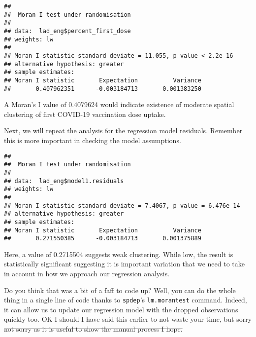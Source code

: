\documentclass[
]{book}
\newenvironment{Shaded}{\begin{snugshade}}{\end{snugshade}}
\newcommand{\CommentTok}[1]{\textcolor[rgb]{0.56,0.35,0.01}{\textit{#1}}}
\newcommand{\FunctionTok}[1]{\textcolor[rgb]{0.00,0.00,0.00}{#1}}
\newcommand{\NormalTok}[1]{#1}
\newcommand{\OtherTok}[1]{\textcolor[rgb]{0.56,0.35,0.01}{#1}}
\newcommand{\SpecialCharTok}[1]{\textcolor[rgb]{0.00,0.00,0.00}{#1}}
\begin{document}
\begin{verbatim}
## 
##  Moran I test under randomisation
## 
## data:  lad_eng$percent_first_dose  
## weights: lw    
## 
## Moran I statistic standard deviate = 11.055, p-value < 2.2e-16
## alternative hypothesis: greater
## sample estimates:
## Moran I statistic       Expectation          Variance 
##       0.407962351      -0.003184713       0.001383250
\end{verbatim}

A Moran's I value of 0.4079624 would indicate existence of moderate spatial clustering of first COVID-19 vaccination dose uptake.

Next, we will repeat the analysis for the regression model residuals. Remember this is more important in checking the model assumptions.

\begin{Shaded}
\end{Shaded}

\begin{verbatim}
## 
##  Moran I test under randomisation
## 
## data:  lad_eng$model1.residuals  
## weights: lw    
## 
## Moran I statistic standard deviate = 7.4067, p-value = 6.476e-14
## alternative hypothesis: greater
## sample estimates:
## Moran I statistic       Expectation          Variance 
##       0.271550385      -0.003184713       0.001375889
\end{verbatim}

Here, a value of 0.2715504 suggests weak clustering. While low, the result is statistically significant suggesting it is important variation that we need to take in account in how we approach our regression analysis.

Do you think that was a bit of a faff to code up? Well, you can do the whole thing in a single line of code thanks to \texttt{spdep}'s \texttt{lm.morantest} command. Indeed, it can allow us to update our regression model with the dropped observations quickly too. \sout{OK I should I have said this earlier to not waste your time, but sorry not sorry as it is useful to show the manual process I hope.}
\end{document}
